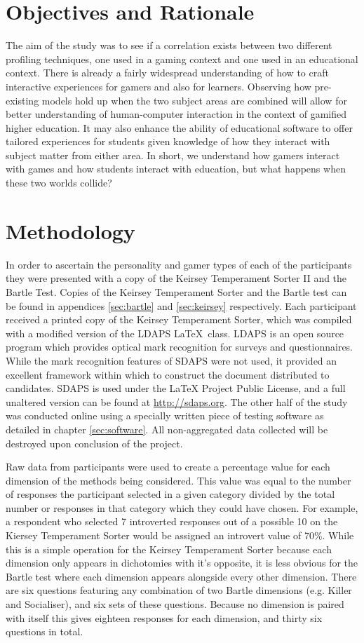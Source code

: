 \documentclass[12pt,a4paper,twoside]{report}
\begin{document}
\section{Objectives and Rationale}
The aim of the study was to see if a correlation exists between two different profiling techniques, one used in a gaming context and one used in an educational context. There is already a fairly widespread understanding of how to craft interactive experiences for gamers and also for learners. Observing how pre-existing models hold up when the two subject areas are combined will allow for better understanding of human-computer interaction in the context of gamified higher education. It may also enhance the ability of educational software to offer tailored experiences for students given knowledge of how they interact with subject matter from either area. In short, we understand how gamers interact with games and how students interact with education, but what happens when these two worlds collide?

\section{Methodology}
\label{method}
In order to ascertain the personality and gamer types of each of the participants they were presented with a copy of the Keirsey Temperament Sorter II and the Bartle Test. Copies of the Keirsey Temperament Sorter and the Bartle test can be found in appendices \ref{sec:bartle} and \ref{sec:keirsey} respectively. Each participant received a printed copy of the Keirsey Temperament Sorter, which was compiled with a modified version of the LDAPS  \LaTeX \ class. LDAPS is an open source program which provides optical mark recognition for surveys and questionnaires. While the mark recognition features of SDAPS were not used, it provided an excellent framework within which to construct the document distributed to candidates. SDAPS is used under the LaTeX Project Public License, and a full unaltered version can be found at \url{http://sdaps.org}. The other half of the study was conducted online using a specially written piece of testing software as detailed in chapter \ref{sec:software}. All non-aggregated data collected will be destroyed upon conclusion of the project.

Raw data from participants were used to create a percentage value for each dimension of the methods being considered. This value was equal to the number of responses the participant selected in a given category divided by the total number or responses in that category which they could have chosen. For example, a respondent who selected 7 introverted responses out of a possible 10 on the Kiersey Temperament Sorter would be assigned an introvert value of 70\%. While this is a simple operation for the Keirsey Temperament Sorter because each dimension only appears in dichotomies with it's opposite, it is less obvious for the Bartle test where each dimension appears alongside every other dimension. There are six questions featuring any combination of two Bartle dimensions (e.g. Killer and Socialiser), and six sets of these questions. Because no dimension is paired with itself this gives eighteen responses for each dimension, and thirty six questions in total.
\end{document}
